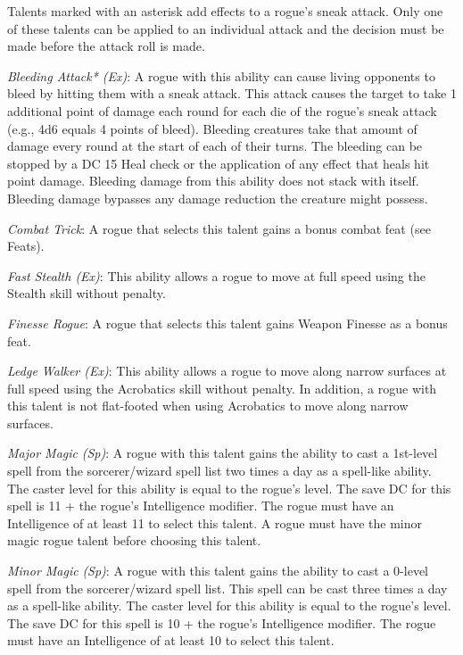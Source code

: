 Talents marked with an asterisk add effects to a rogue's sneak attack. Only one of these talents can be applied to an individual attack and the decision must be made before the attack roll is made. 
				
\textit{Bleeding Attack* (Ex)}: A rogue with this ability can cause living opponents to bleed by hitting them with a sneak attack. This attack causes the target to take 1 additional point of damage each round for each die of the rogue's sneak attack (e.g., 4d6 equals 4 points of bleed). Bleeding creatures take that amount of damage every round at the start of each of their turns. The bleeding can be stopped by a DC 15 Heal check or the application of any effect that heals hit point damage. Bleeding damage from this ability does not stack with itself. Bleeding damage bypasses any damage reduction the creature might possess.
				
\textit{Combat Trick}: A rogue that selects this talent gains a bonus combat feat (see Feats).
				
\textit{Fast Stealth (Ex)}: This ability allows a rogue to move at full speed using the Stealth skill without penalty.
				
\textit{Finesse Rogue}: A rogue that selects this talent gains Weapon Finesse as a bonus feat.
				
\textit{Ledge Walker (Ex)}: This ability allows a rogue to move along narrow surfaces at full speed using the Acrobatics skill without penalty. In addition, a rogue with this talent is not flat-footed when using Acrobatics to move along narrow surfaces.
				
\textit{Major Magic} \textit{(Sp)}: A rogue with this talent gains the ability to cast a 1st-level spell from the sorcerer/wizard spell list two times a day as a spell-like ability. The caster level for this ability is equal to the rogue's level. The save DC for this spell is 11 + the rogue's Intelligence modifier. The rogue must have an Intelligence of at least 11 to select this talent. A rogue must have the minor magic rogue talent before choosing this talent.
				
\textit{Minor Magic} \textit{(Sp)}: A rogue with this talent gains the ability to cast a 0-level spell from the sorcerer/wizard spell list. This spell can be cast three times a day as a spell-like ability. The caster level for this ability is equal to the rogue's level. The save DC for this spell is 10 + the rogue's Intelligence modifier. The rogue must have an Intelligence of at least 10 to select this talent.
				
